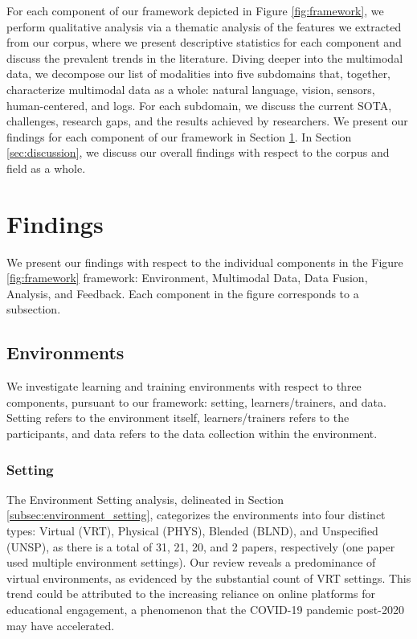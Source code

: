 \documentclass[manuscript,screen,review]{acmart}
\begin{document}
For each component of our framework depicted in Figure \ref{fig:framework}, we perform qualitative analysis via a thematic analysis of the features we extracted from our corpus, where we present descriptive statistics for each component and discuss the prevalent trends in the literature. Diving deeper into the multimodal data, we decompose our list of modalities into five subdomains that, together, characterize multimodal data as a whole: natural language, vision, sensors, human-centered, and logs. For each subdomain, we discuss the current SOTA, challenges, research gaps, and the results achieved by researchers. We present our findings for each component of our framework in Section \ref{sec:findings}. In Section \ref{sec:discussion}, we discuss our overall findings with respect to the corpus and field as a whole.

\section{Findings}\label{sec:findings}
We present our findings with respect to the individual components in the Figure \ref{fig:framework} framework: Environment, Multimodal Data, Data Fusion, Analysis, and Feedback. Each component in the figure corresponds to a subsection. 

\subsection{Environments}
We investigate learning and training environments with respect to three components, pursuant to our framework: setting, learners/trainers, and data. Setting refers to the environment itself, learners/trainers refers to the participants, and data refers to the data collection within the environment.

\subsubsection{Setting}


The Environment Setting analysis, delineated in Section \ref{subsec:environment_setting}, categorizes the environments into four distinct types: Virtual (VRT), Physical (PHYS), Blended (BLND), and Unspecified (UNSP), as there is a total of 31, 21, 20, and 2 papers, respectively (one paper \cite{3637456466} used multiple environment settings). Our review reveals a predominance of virtual environments, as evidenced by the substantial count of VRT settings. This trend could be attributed to the increasing reliance on online platforms for educational engagement, a phenomenon that the COVID-19 pandemic post-2020 may have accelerated.
\end{document}
